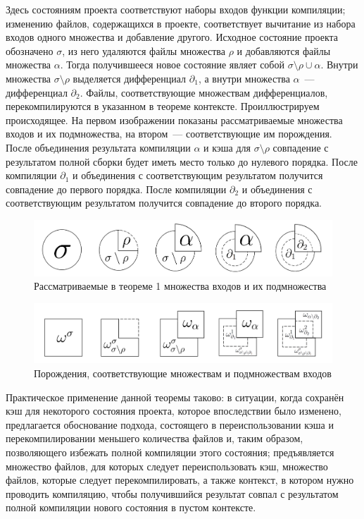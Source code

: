 Здесь состояниям проекта соответствуют наборы входов функции компиляции; изменению файлов, содержащихся в проекте, соответствует вычитание из набора входов одного множества и добавление другого. Исходное состояние проекта обозначено $\sigma$, из него удаляются файлы множества $\rho$ и добавляются файлы множества $\alpha$. Тогда получившееся новое состояние являет собой $\sigma\setminus\rho\cup\alpha$. Внутри множества $\sigma\setminus\rho$ выделяется дифференциал $\partial_1$, а внутри множества $\alpha$~--- дифференциал $\partial_2$. Файлы, соответствующие множествам дифференциалов, перекомпилируются в указанном в теореме контексте. Проиллюстрируем происходящее. На первом изображении показаны рассматриваемые множества входов и их подмножества, на втором~--- соответствующие им порождения. После объединения результата компиляции $\alpha$ и кэша для $\sigma\setminus\rho$ совпадение с результатом полной сборки будет иметь место только до нулевого порядка. После компиляции $\partial_1$ и объединения с соответствующим результатом получится совпадение до первого порядка. После компиляции $\partial_2$ и объединения с соответствующим результатом получится совпадение до второго порядка.

\begin{figure}[h]
	\centering
	\includegraphics[width=160mm]{theorem1_src.png}
	\caption{Рассматриваемые в теореме 1 множества входов и их подмножества}
	\label{fig:theorem1_src}
\end{figure}

\begin{figure}[h]
	\centering
	\includegraphics[width=160mm]{theorem1_dst.png}
	\caption{Порождения, соответствующие множествам и подмножествам входов}
	\label{fig:theorem1_dst}
\end{figure}

Практическое применение данной теоремы таково: в ситуации, когда сохранён кэш для некоторого состояния проекта, которое впоследствии было изменено, предлагается обоснование подхода, состоящего в переиспользовании кэша и перекомпилировании меньшего количества файлов и, таким образом, позволяющего избежать полной компиляции этого состояния; предъявляется множество файлов, для которых следует переиспользовать кэш, множество файлов, которые следует перекомпилировать, а также контекст, в котором нужно проводить компиляцию, чтобы получившийся результат совпал с результатом полной компиляции нового состояния в пустом контексте.

